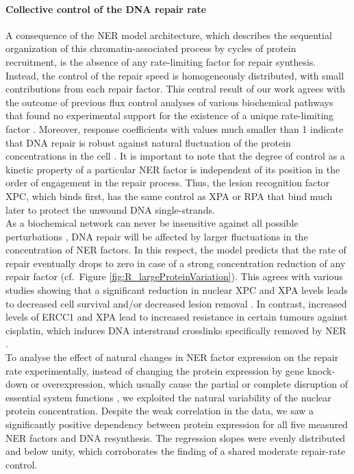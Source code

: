 \paragraph{Collective control of the DNA repair rate}
A consequence of the NER model architecture, which describes the sequential organization of this chromatin-associated process by cycles of protein recruitment, is the absence of any rate-limiting factor for repair synthesis. Instead, the control of the repair speed is homogeneously distributed, with small contributions from each repair factor. This central result of our work agrees with the outcome of previous flux control analyses of various biochemical pathways that found no experimental support for the existence of a unique rate-limiting factor \cite{Fell1992}. Moreover, response coefficients with values much smaller than 1 indicate that DNA repair is robust  against natural fluctuation of the protein concentrations in the cell \cite{Bluthgen2013}. It is important to note that the degree of control as a kinetic property of a particular NER factor is independent of its position in the order of engagement in the repair process. Thus, the lesion recognition factor XPC, which binds first, has the same control as XPA or RPA that bind much later to protect the unwound DNA single-strands.\\
As a biochemical network can never be insensitive against all possible perturbations \cite{Bluthgen2013,Csete2002}, DNA repair will be affected by larger fluctuations in the concentration of NER factors. In this respect, the model predicts that the rate of repair eventually drops to zero in case of a strong concentration reduction of any repair factor (cf.\ Figure \ref{fig:R_largeProteinVariation}). This agrees with various studies showing that a significant reduction in nuclear XPC and XPA levels leads to decreased cell survival and/or decreased lesion removal \cite{Koberle1999,Koberle2006,Renaud2011}. In contrast, increased levels of ERCC1 and XPA lead to increased resistance in certain tumours against cisplatin, which induces DNA interstrand crosslinks specifically removed by NER \cite{Koberle1999,Koberle2006,Renaud2011,Stewart2007,Arora2010}.   
\\ 
To analyse the effect of natural changes in NER factor expression on the repair rate experimentally, instead of changing the protein expression by gene knock-down or overexpression, which usually cause the partial or complete disruption of essential system functions \cite{Moriya2006}, we exploited the natural variability of the nuclear protein concentration. Despite the weak correlation in the data, we saw a significantly positive dependency between protein expression for all five measured NER factors and DNA resynthesis. The regression slopes were evenly distributed and below unity, which corroborates the finding of a shared moderate repair-rate control.\\  
